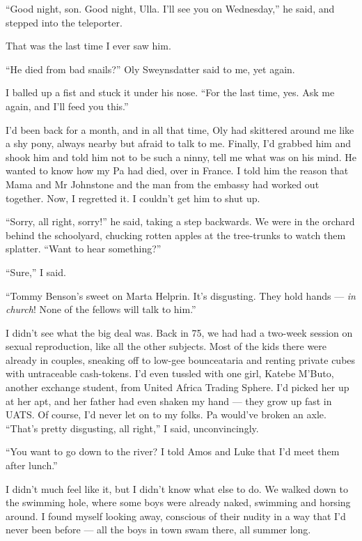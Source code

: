 ``Good night, son. Good night, Ulla. I'll see you on Wednesday,''
he said, and stepped into the teleporter.

That was the last time I ever saw him.

\tb

``He died from bad snails?'' Oly Sweynsdatter said to me, yet
again.

I balled up a fist and stuck it under his nose.
``For the last time, yes. Ask me again, and I'll feed you this.''

I'd been back for a month, and in all that time, Oly had skittered
around me like a shy pony, always nearby but afraid to talk to me.
Finally, I'd grabbed him and shook him and told him not to be such
a ninny, tell me what was on his mind. He wanted to know how my Pa
had died, over in France. I told him the reason that Mama and Mr
Johnstone and the man from the embassy had worked out together.
Now, I regretted it. I couldn't get him to shut up.

``Sorry, all right, sorry!'' he said, taking a step backwards. We
were in the orchard behind the schoolyard, chucking rotten apples
at the tree-trunks to watch them splatter.
``Want to hear something?''

``Sure,'' I said.

``Tommy Benson's sweet on Marta Helprin. It's disgusting. They hold hands --- 
\emph{in church}! None of the fellows will talk to him.''

I didn't see what the big deal was. Back in 75, we had had a
two-week session on sexual reproduction, like all the other
subjects. Most of the kids there were already in couples, sneaking
off to low-gee bounceataria and renting private cubes with
untraceable cash-tokens. I'd even tussled with one girl, Katebe
M'Buto, another exchange student, from United Africa Trading
Sphere. I'd picked her up at her apt, and her father had even
shaken my hand --- they grow up fast in UATS. Of course, I'd never
let on to my folks. Pa would've broken an axle.
``That's pretty disgusting, all right,'' I said, unconvincingly.

``You want to go down to the river? I told Amos and Luke that I'd meet them 
after lunch.''

I didn't much feel like it, but I didn't know what else to do. We
walked down to the swimming hole, where some boys were already
naked, swimming and horsing around. I found myself looking away,
conscious of their nudity in a way that I'd never been before ---
all the boys in town swam there, all summer long.

